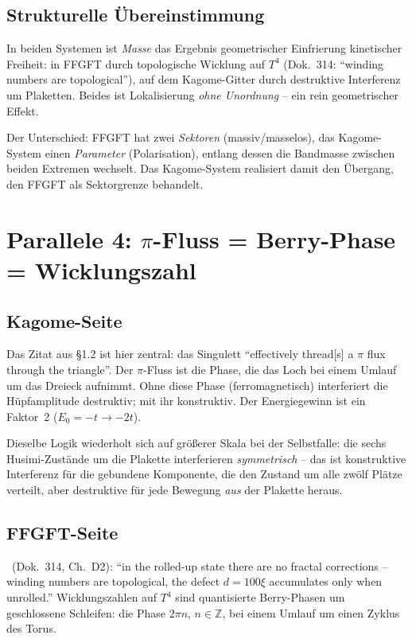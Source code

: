 \subsection{Strukturelle Übereinstimmung}

In beiden Systemen ist \emph{Masse} das Ergebnis geometrischer Einfrierung
kinetischer Freiheit: in FFGFT durch topologische Wicklung auf $T^4$
(Dok.~314: \enquote{winding numbers are topological}), auf dem Kagome-Gitter
durch destruktive Interferenz um Plaketten. Beides ist Lokalisierung
\emph{ohne Unordnung} -- ein rein geometrischer Effekt. \SM

Der Unterschied: FFGFT hat zwei \emph{Sektoren} (massiv/masselos), das
Kagome-System einen \emph{Parameter} (Polarisation), entlang dessen die
Bandmasse zwischen beiden Extremen wechselt. Das Kagome-System realisiert
damit den Übergang, den FFGFT als Sektorgrenze behandelt.

\section{Parallele 4: $\pi$-Fluss = Berry-Phase = Wicklungszahl}

\subsection{Kagome-Seite}

Das Zitat aus §1.2 ist hier zentral: das Singulett \enquote{effectively
thread[s] a $\pi$ flux through the triangle}. Der $\pi$-Fluss ist die Phase,
die das Loch bei einem Umlauf um das Dreieck aufnimmt. Ohne diese Phase
(ferromagnetisch) interferiert die Hüpfamplitude destruktiv; mit ihr
konstruktiv. Der Energiegewinn ist ein Faktor~2 ($E_0=-t\to-2t$).

Dieselbe Logik wiederholt sich auf größerer Skala bei der Selbstfalle: die
sechs Husimi-Zustände um die Plakette interferieren \emph{symmetrisch} --
das ist konstruktive Interferenz für die gebundene Komponente, die den
Zustand um alle zwölf Plätze verteilt, aber destruktive für jede
Bewegung \emph{aus} der Plakette heraus.

\subsection{FFGFT-Seite}

\BM\ (Dok.~314, Ch.~D2): \enquote{in the rolled-up state there are no
fractal corrections -- winding numbers are topological, the defect $d=100\xi$
accumulates only when unrolled.} Wicklungszahlen auf $T^4$ sind quantisierte
Berry-Phasen um geschlossene Schleifen: die Phase $2\pi n$, $n\in\mathbb{Z}$,
bei einem Umlauf um einen Zyklus des Torus.

